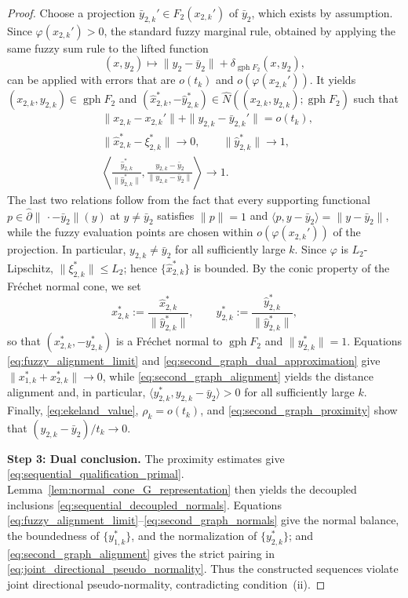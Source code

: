 \documentclass[12pt,twoside,reqno]{amsart}
\theoremstyle{definition}
\numberwithin{equation}{section}
\begin{document}
\begin{proof}
Choose a projection $\bar{y}_{2,k}'\in F_2(x_{2,k}')$ of $\bar{y}_2$, which exists by assumption. Since $\varphi(x_{2,k}')>0$, the standard fuzzy marginal rule, obtained by applying the same fuzzy sum rule to the lifted function
\[
    (x,y_2)\mapsto\|y_2-\bar{y}_2\|
       +\delta_{\operatorname{gph}F_2}(x,y_2),
\]
can be applied with errors that are $o(t_k)$ and $o(\varphi(x_{2,k}'))$. It yields $(x_{2,k},y_{2,k})\in\operatorname{gph}F_2$ and $(\widehat x_{2,k}^*,-\widehat y_{2,k}^*)\in\widehat N((x_{2,k},y_{2,k});\operatorname{gph}F_2)$ such that
\begin{align}
    &\|x_{2,k}-x_{2,k}'\|+\|y_{2,k}-\bar{y}_{2,k}'\|=o(t_k), \label{eq:second_graph_proximity}\;\\
    &\|\widehat x_{2,k}^*-\xi_{2,k}^*\|\to0,
      \qquad \|\widehat y_{2,k}^*\|\to1, \label{eq:second_graph_dual_approximation}\\
    &\left\langle
       \frac{\widehat y_{2,k}^*}{\|\widehat y_{2,k}^*\|},
       \frac{y_{2,k}-\bar{y}_2}{\|y_{2,k}-\bar{y}_2\|}
      \right\rangle\to1. \label{eq:second_graph_alignment}
\end{align}
The last two relations follow from the fact that every supporting functional $p\in\widehat\partial\|\,\cdot-\bar{y}_2\|(y)$ at $y\ne\bar{y}_2$ satisfies $\|p\|=1$ and $\langle p,y-\bar{y}_2\rangle=\|y-\bar{y}_2\|$, while the fuzzy evaluation points are chosen within $o(\varphi(x_{2,k}'))$ of the projection. In particular, $y_{2,k}\ne\bar{y}_2$ for all sufficiently large $k$. Since $\varphi$ is $L_2$-Lipschitz, $\|\xi_{2,k}^*\|\le L_2$; hence $\{\widehat x_{2,k}^*\}$ is bounded. By the conic property of the Fr\'echet normal cone, we set
\begin{equation}\label{eq:second_graph_normals}
    x_{2,k}^*:=\frac{\widehat x_{2,k}^*}{\|\widehat y_{2,k}^*\|},
    \qquad
    y_{2,k}^*:=\frac{\widehat y_{2,k}^*}{\|\widehat y_{2,k}^*\|},
\end{equation}
so that $(x_{2,k}^*,-y_{2,k}^*)$ is a Fr\'echet normal to $\operatorname{gph}F_2$ and $\|y_{2,k}^*\|=1$. Equations \eqref{eq:fuzzy_alignment_limit} and \eqref{eq:second_graph_dual_approximation} give $\|x_{1,k}^*+x_{2,k}^*\|\to0$, while \eqref{eq:second_graph_alignment} yields the distance alignment and, in particular, $\langle y_{2,k}^*,y_{2,k}-\bar{y}_2\rangle>0$ 
for all sufficiently large $k$. Finally,
\eqref{eq:ekeland_value}, $\rho_k=o(t_k)$, and
\eqref{eq:second_graph_proximity} show that
$(y_{2,k}-\bar{y}_2)/t_k\to0$.

\textbf{Step 3: Dual conclusion.}
The proximity estimates give \eqref{eq:sequential_qualification_primal}. Lemma~\ref{lem:normal_cone_G_representation} then yields the decoupled inclusions \eqref{eq:sequential_decoupled_normals}. Equations \eqref{eq:fuzzy_alignment_limit}--\eqref{eq:second_graph_normals} give the normal balance, the boundedness of $\{y_{1,k}^*\}$, and the normalization of $\{y_{2,k}^*\}$; and \eqref{eq:second_graph_alignment} gives the strict pairing in \eqref{eq:joint_directional_pseudo_normality}. Thus the constructed sequences violate joint directional pseudo-normality, contradicting condition~(ii).  
\end{proof}
\end{document}
